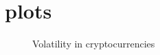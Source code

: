 %
%
%





\section{plots}\label{sec:plots}

\begin{figure}[!htb]
	\centering
	\hfill
	\caption{Volatility in cryptocurrencies}
	\label{fig:fiatandcrypto}
\end{figure}



